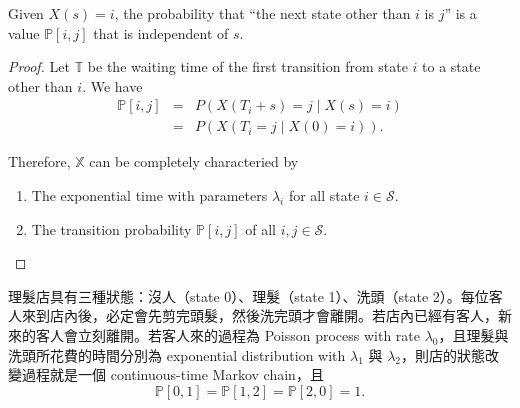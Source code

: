\begin{observation}
Given $ X(s) = i $, the probability that ``the next state other than $ i $ is $ j $'' is a value $ \mathbb{P}[i, j] $ that is independent of $ s $.
\begin{proof}
Let $ \mathbb{T} $ be the waiting time of the first transition from state $ i $ to a state other than $ i $. We have
\begin{eqnarray*}
\mathbb{P}[i, j]
  & = & P(X(T_{i} + s) = j \mid X(s) = i) \\
  & = & P(X(T_{i} = j \mid X(0) = i)).
\end{eqnarray*}

Therefore, $ \mathbb{X} $ can be completely characteried by
\begin{enumerate}
  \item The exponential time with parameters $ \lambda_{i} $ for all state $ i \in \mathcal{S} $.
  \item The transition probability $ \mathbb{P}[i, j] $ of all $ i, j \in \mathcal{S} $.
\end{enumerate}
\end{proof}
\end{observation}

\begin{example}
理髮店具有三種狀態：沒人（state 0）、理髮（state 1）、洗頭（state 2）。每位客人來到店內後，必定會先剪完頭髮，然後洗完頭才會離開。若店內已經有客人，新來的客人會立刻離開。若客人來的過程為 Poisson process with rate $ \lambda_{0} $，且理髮與洗頭所花費的時間分別為 exponential distribution with $ \lambda_{1} $ 與 $ \lambda_{2} $，則店的狀態改變過程就是一個 continuous-time Markov chain，且
\[ \mathbb{P}[0, 1] = \mathbb{P}[1, 2] = \mathbb{P}[2, 0] = 1. \]
\end{example}
